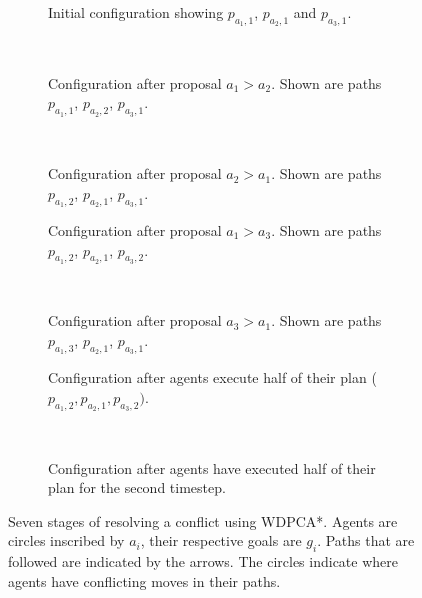 \begin{figure}
    \centering
    \begin{subfigure}[t]{.3\textwidth}
        \centering
        \def\svgscale{.6}
        
        \caption{Initial configuration showing $p_{a_1,1}$, $p_{a_2,1}$ and 
            $p_{a_3,1}$.}
        \label{fig:wdpca-example1}
    \end{subfigure}
    ~
    \begin{subfigure}[t]{.3\textwidth}
        \centering
        \def\svgscale{.6}
        
        \caption{Configuration after proposal $a_1 > a_2$. Shown are paths 
            $p_{a_1,1}$, $p_{a_2,2}$, $p_{a_3,1}$.}
        \label{fig:wdpca-example2}
    \end{subfigure}
    ~
    \begin{subfigure}[t]{.3\textwidth}
        \centering
        \def\svgscale{.6}
        
        \caption{Configuration after proposal $a_2 > a_1$. Shown are paths 
            $p_{a_1,2}$, $p_{a_2,1}$, $p_{a_3,1}$.}
        \label{fig:wdpca-example3}
    \end{subfigure}
    
    \begin{subfigure}[t]{.4\textwidth}
        \centering
        \def\svgscale{.6}
        
        \caption{Configuration after proposal $a_1 > a_3$. Shown are paths 
            $p_{a_1,2}$, $p_{a_2,1}$, $p_{a_3,2}$.}
        \label{fig:wdpca-example4}
    \end{subfigure}
    ~
    \begin{subfigure}[t]{.4\textwidth}
        \centering
        \def\svgscale{.6}
        
        \caption{Configuration after proposal $a_3 > a_1$. Shown are paths 
            $p_{a_1,3}$, $p_{a_2,1}$, $p_{a_3,1}$.}
        \label{fig:wdpca-example5}
    \end{subfigure}

    \begin{subfigure}[t]{.4\textwidth}
        \centering
        \def\svgscale{.6}
        
        \caption{Configuration after agents execute half of their plan 
        ($p_{a_1,2}, p_{a_2,1}, p_{a_3,2})$.}
        \label{fig:wdpca-example6}
    \end{subfigure}
    ~
    \begin{subfigure}[t]{.4\textwidth}
        \centering
        \def\svgscale{.6}
        
        \caption{Configuration after agents have executed half of their plan 
        for the second timestep.}
        \label{fig:wdpca-example7}
    \end{subfigure}
    
    \caption{Seven stages of resolving a conflict using WDPCA*. Agents are 
        circles inscribed
        by $a_i$, their respective goals are $g_i$. Paths that are followed are
        indicated by the arrows. The circles indicate where agents have 
        conflicting moves in their paths.}
    \label{fig:wdpca-example}
\end{figure}

